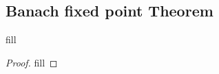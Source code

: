 \subsection{Banach fixed point Theorem}

\begin{exercise}{1}
fill
\end{exercise}
\begin{proof}
fill
\end{proof}